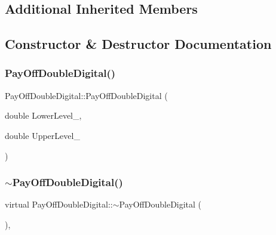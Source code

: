 \subsection*{Additional Inherited Members}


\subsection{Constructor \& Destructor Documentation}
\hypertarget{classPayOffDoubleDigital_a2638053513b5df1016d3b57162a02bbd}{}\label{classPayOffDoubleDigital_a2638053513b5df1016d3b57162a02bbd} 
\subsubsection{\texorpdfstring{Pay\+Off\+Double\+Digital()}{PayOffDoubleDigital()}\hspace{0.1cm}{\footnotesize\ttfamily [1/3]}}
{\footnotesize\ttfamily Pay\+Off\+Double\+Digital\+::\+Pay\+Off\+Double\+Digital (\begin{DoxyParamCaption}\item[{double}]{Lower\+Level\+\_\+,  }\item[{double}]{Upper\+Level\+\_\+ }\end{DoxyParamCaption})}

\hypertarget{classPayOffDoubleDigital_adc7cd94c9210b08afb93f6771bef2e10}{}\label{classPayOffDoubleDigital_adc7cd94c9210b08afb93f6771bef2e10} 
\subsubsection{\texorpdfstring{$\sim$\+Pay\+Off\+Double\+Digital()}{~PayOffDoubleDigital()}\hspace{0.1cm}{\footnotesize\ttfamily [1/2]}}
{\footnotesize\ttfamily virtual Pay\+Off\+Double\+Digital\+::$\sim$\+Pay\+Off\+Double\+Digital (\begin{DoxyParamCaption}{ }\end{DoxyParamCaption})\hspace{0.3cm}{\ttfamily [inline]}, {\ttfamily [virtual]}}

